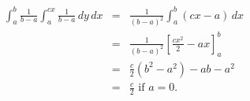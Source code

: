$$
\begin{align*}
\int_a^b \! \frac{1}{b-a} \int_a^{cx} \! \frac{1}{b-a} \, dy \, dx
&=& \frac{1}{(b-a)^2} \int_a^{b} (cx - a) \, dx  \\
&=& \frac{1}{(b-a)^2}\left[\frac{cx^2}{2} - ax\right]_a^b \\
&=& \frac{c}{2}\left(b^2 - a^2\right) - ab - a^2 \\
&=& \frac{c}{2} \text{ if } a = 0.
\end{align*}
$$
